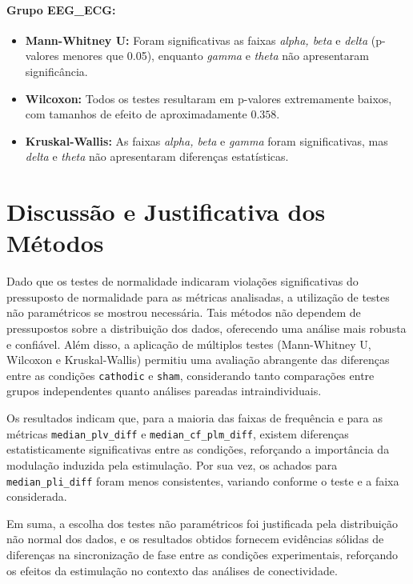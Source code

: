 \paragraph{Grupo EEG\_ECG:}
\begin{itemize}
    \item \textbf{Mann-Whitney U:} Foram significativas as faixas \emph{alpha, beta} e \emph{delta} (p-valores menores que 0.05), enquanto \emph{gamma} e \emph{theta} não apresentaram significância.
    \item \textbf{Wilcoxon:} Todos os testes resultaram em p-valores extremamente baixos, com tamanhos de efeito de aproximadamente $0.358$.
    \item \textbf{Kruskal-Wallis:} As faixas \emph{alpha, beta} e \emph{gamma} foram significativas, mas \emph{delta} e \emph{theta} não apresentaram diferenças estatísticas.
\end{itemize}

\section{Discussão e Justificativa dos Métodos}

Dado que os testes de normalidade indicaram violações significativas do pressuposto de normalidade para as métricas analisadas, a utilização de testes não paramétricos se mostrou necessária. Tais métodos não dependem de pressupostos sobre a distribuição dos dados, oferecendo uma análise mais robusta e confiável. Além disso, a aplicação de múltiplos testes (Mann-Whitney U, Wilcoxon e Kruskal-Wallis) permitiu uma avaliação abrangente das diferenças entre as condições \texorpdfstring{\texttt{cathodic}}{cathodic} e \texorpdfstring{\texttt{sham}}{sham}, considerando tanto comparações entre grupos independentes quanto análises pareadas intraindividuais.

Os resultados indicam que, para a maioria das faixas de frequência e para as métricas \texorpdfstring{\texttt{median\_plv\_diff}}{median_plv_diff} e \texorpdfstring{\texttt{median\_cf\_plm\_diff}}{median_cf_plm_diff}, existem diferenças estatisticamente significativas entre as condições, reforçando a importância da modulação induzida pela estimulação. Por sua vez, os achados para \texorpdfstring{\texttt{median\_pli\_diff}}{median_pli_diff} foram menos consistentes, variando conforme o teste e a faixa considerada.

Em suma, a escolha dos testes não paramétricos foi justificada pela distribuição não normal dos dados, e os resultados obtidos fornecem evidências sólidas de diferenças na sincronização de fase entre as condições experimentais, reforçando os efeitos da estimulação no contexto das análises de conectividade.

